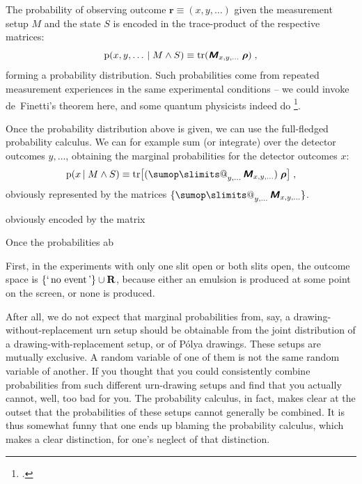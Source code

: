 \documentclass[\ifafour a4paper,12pt,\else a5paper,10pt,\fi%
onecolumn,oneside,article,%
british%
]{memoir}
\makeatletter
\newcommand*{\defquote}[1]{`\,#1\,'}
\theoremstyle{remark}
\theoremstyle{innote}
\def\sum{\DOTSI\sumop\slimits@}
\newcommand*{\mathte}[1]{\textbf{\textit{\textsf{#1}}}}
\newcommand*{\citep}{\footcites}
\newcommand*{\RR}{\bm{\mathrm{R}}}
\DeclareMathOperator{\tr}{tr}%
\DeclarePairedDelimiter\set{\{}{\}}
\newcommand*{\pf}{\mathrm{p}}%
\renewcommand*{\|}[1][]{\nonscript\,#1\vert\nonscript\;\mathopen{}}
\newcommand*{\tsum}{\mathop{\textstyle\sum}\nolimits}
\newcommand*{\yr}{\bm{\rho}}
\newcommand*{\yM}{\mathte{M}}
\makeatother
\begin{document}
The probability of observing outcome $\bm{r}\equiv (x, y, \dotsc)$ given
the measurement setup $M$ and the state $S$ is encoded in the trace-product
of the respective matrices:
\begin{equation}
  \label{eq:povm_trace}
  \pf(x,y,\dotsc \| M \land S) \equiv \tr(\yM_{x,y,\dotsc}\;\yr) \;,
\end{equation}
forming a probability distribution. Such probabilities come from repeated
measurement experiences in the same experimental conditions -- we could
invoke de~Finetti's theorem here, and some quantum physicists indeed do
\citep{cavesetal2002,vanenketal2002,fuchsetal2004b}.

Once the probability distribution above is given, we can use the
full-fledged probability calculus. We can for example sum (or integrate) over the
detector outcomes $y,\dotsc$, obtaining the marginal probabilities for
the detector outcomes $x$:
\begin{equation}
  \label{eq:povm_trace_marginal}
  \pf(x\| M \land S) \equiv
  \tr\bigl[(\tsum_{y,\dotsc}\yM_{x,y,\dotsc})\;\yr\bigr] \;,
\end{equation}
obviously represented by the matrices $\set{\tsum_{y,\dotsc}\yM_{x,y,\dotsc}}$.


obviously encoded by the matrix


Once the probabilities ab




First, in the experiments with only one slit open or both slits open, the outcome
space is $\set{\textrm{\defquote{no event}}} \cup \RR$, because either an
emulsion is produced at some point on the screen, or none is produced.





After all, we do not expect that marginal probabilities from, say, a
drawing-without-replacement urn setup should be obtainable from the joint
distribution of a drawing-with-replacement setup, or of P\'olya drawings.
These setups are mutually exclusive. A random variable of one of them is
not the same random variable of another. If you thought that you could
consistently combine probabilities from such different urn-drawing setups
and find that you actually cannot, well, too bad for you. The probability
calculus, in fact, makes clear at the outset that the probabilities of these
setups cannot generally be combined. It is thus somewhat funny that one
ends up blaming the probability calculus, which makes a clear distinction,
for one's neglect of that distinction.
\end{document}
